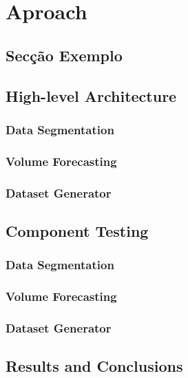\chapter{Aproach}\label{chap:chap4}

\section*{}

\section{Secção Exemplo}

\section{High-level Architecture}

\subsection{Data Segmentation}

\subsection{Volume Forecasting}

\subsection{Dataset Generator}

\section{Component Testing}

\subsection{Data Segmentation}

\subsection{Volume Forecasting}

\subsection{Dataset Generator}


\section{Results and Conclusions}

